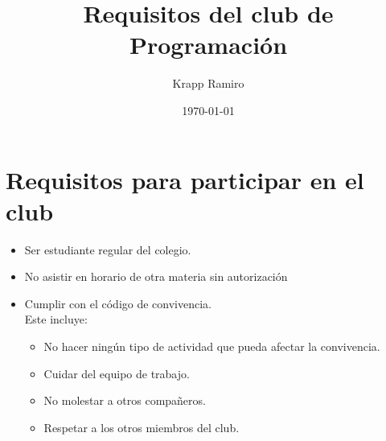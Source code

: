 \documentclass{article}
\title{Requisitos del club de Programación}
\date{\today}
\author{Krapp Ramiro}
\begin{document}
\maketitle
\thispagestyle{fancy}
\section{Requisitos para participar en el club}
\begin{itemize}
	\item Ser estudiante regular del colegio.
	\item No asistir en horario de otra materia sin autorización
	\item Cumplir con el código de convivencia.\\
	      Este incluye:
	      \begin{itemize}
		      \item No hacer ningún tipo de actividad que pueda afectar la convivencia.
		      \item Cuidar del equipo de trabajo.
		      \item No molestar a otros compañeros.
		      \item Respetar a los otros miembros del club.
	      \end{itemize}
\end{itemize}
\end{document}
